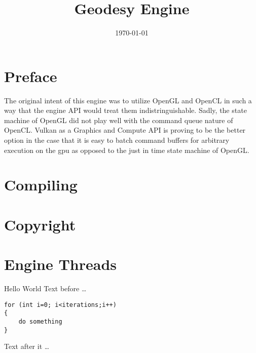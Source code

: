 \documentclass{book}
\title{Geodesy Engine}
\date{\today}
\begin{document}
\maketitle

\tableofcontents

\frontmatter
\chapter{Preface}
The original intent of this engine was to utilize OpenGL and OpenCL in such a way that the engine API would treat them indistringuishable. Sadly, the state machine of OpenGL did not play well with the command queue nature of OpenCL. Vulkan as a Graphics and Compute API is proving to be the better option in the case that it is easy to batch command buffers for arbitrary execution on the gpu as opposed to the just in time state machine of OpenGL.
\mainmatter
\chapter{Compiling}

\chapter{Copyright}

\chapter{Engine Threads}

Hello World
Text before \dots
\begin{lstlisting}
for (int i=0; i<iterations;i++)
{
	do something
}
\end{lstlisting}
Text after it \dots
\end{document}
